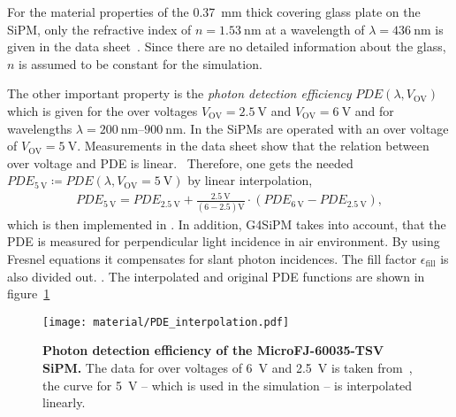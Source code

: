 For the material properties of the \SI{0.37}{\milli\meter} thick covering glass plate on the SiPM, only the refractive index of $n = \SI{1.53}{\nano\meter}$ at a wavelength of $\lambda = \SI{436}{\nano\meter}$ is given in the data sheet~\cite{sipm:datasheet}. Since there are no detailed information about the glass, $n$ is assumed to be constant for the simulation.

The other important property is the \textit{photon detection efficiency} $PDE(\lambda,V_\text{OV})$ which is given for the over voltages $V_\text{OV}=\SI{2.5}{\volt}$ and $V_\text{OV}=\SI{6}{\volt}$ and for wavelengths $\lambda = \SIrange{200}{900}{\nano\meter}$. In \iceact the SiPMs are operated with an over voltage of $V_\text{OV} = \SI{5}{\volt}$. Measurements in the data sheet show that the relation between over voltage and PDE is linear.~\cite{sipm:datasheet} Therefore, one gets the needed $PDE_{\SI{5}{\volt}}\coloneqq PDE(\lambda,V_\text{OV}=\SI{5}{\volt})$ by linear interpolation,
\begin{align}
	PDE_{\SI{5}{\volt}} = PDE_{\SI{2.5}{\volt}} + \frac{\SI{2.5}{\volt}}{(6-2.5)\si{\volt}} \cdot (PDE_{\SI{6}{\volt}}-PDE_{\SI{2.5}{\volt}}),
\end{align}
which is then implemented in \geant. In addition, G4SiPM takes into account, that the PDE is measured for perpendicular light incidence in air environment. By using Fresnel equations it compensates for slant photon incidences. The fill factor $\epsilon_\text{fill}$ is also divided out. \cite{sipm:g4sipm,famous:niggemann}. 
The interpolated and original PDE functions are shown in figure~\ref{sipm:pde}

\begin{figure}[H]
	\centering
	\texttt{[image: material/PDE\_interpolation.pdf]}
	\caption[Photon detection efficiency of the MicroFJ-60035-TSV SiPM]{\textbf{Photon detection efficiency of the MicroFJ-60035-TSV SiPM.} The data for over voltages of \SI{6}{\volt} and \SI{2.5}{\volt} is taken from~\cite{sipm:datasheet}, the curve for \SI{5}{\volt} -- which is used in the \geant simulation -- is interpolated linearly.}
	\label{sipm:pde}	
\end{figure}
